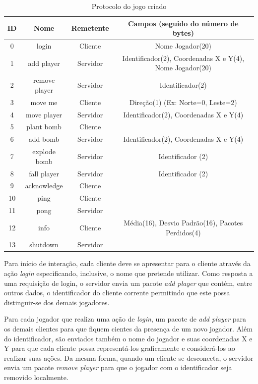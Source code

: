 \documentclass[12pt]{article}
\begin{document}
\begin{table}
  \center
  \footnotesize
  \begin{tabular}{|c|c|c|c|}
  \hline
    \textbf{ID} & \textbf{Nome} & \textbf{Remetente} & \textbf{Campos (seguido do número de bytes)} \\ \hline
    0 & login & Cliente & Nome Jogador(20)  \\ \hline
    1 & add player & Servidor & Identificador(2), Coordenadas X e Y(4), Nome Jogador(20)\\ \hline
    2 & remove player & Servidor & Identificador(2) \\ \hline
    3 & move me & Cliente & Direção(1) (Ex: Norte=0, Leste=2) \\ \hline
    4 & move player & Servidor & Identificador(2), Coordenadas X e Y(4) \\ \hline
    5 & plant bomb & Cliente & \\ \hline
    6 & add bomb & Servidor &  Identificador(2), Coordenadas X e Y(4)  \\ \hline
    7 & explode bomb & Servidor & Identificador (2) \\ \hline
    8 & fall player & Servidor & Identificador (2) \\ \hline
    9 & acknowledge & Cliente & \\ \hline
   10 & ping & Cliente & \\ \hline
   11 & pong & Servidor & \\ \hline
   12 & info & Cliente & Média(16), Desvio Padrão(16), Pacotes Perdidos(4)  \\ \hline
   13 & shutdown & Servidor &\\ \hline
  \end{tabular} 
\caption{Protocolo do jogo criado}
\label{tab:protocolo}
\end{table} 

Para início de interação, cada cliente deve se apresentar para o cliente
através da ação \emph{login} especificando, inclusive, o nome que pretende
utilizar. Como resposta a uma requisição de login, o servidor envia um pacote
\emph{add player} que contém, entre outros dados, o identificador do cliente
corrente permitindo que este possa distinguir-se dos demais jogadores.

Para cada jogador que realiza uma ação de \emph{login}, um pacote de \emph{add player} para
os demais clientes para que fiquem cientes da presença de um novo jogador. Além
do identificador, são enviados também o nome do jogador e suas coordenadas X e
Y para que cada cliente possa representá-los graficamente e considerá-los ao
realizar suas ações. Da mesma forma, quando um cliente se desconecta, o
servidor envia um pacote \emph{remove player} para que o jogador com o identificador
seja removido localmente.
\end{document}
